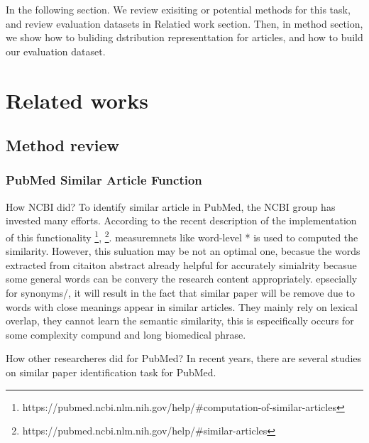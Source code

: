 \documentclass[11pt]{article}
\begin{document}
    In the following section. We review exisiting or potential methods for this task, and review evaluation datasets in Relatied work section. Then, in method section, we show how to buliding dstribution representtation for articles, and how to build our evaluation dataset.

    \section{Related works}

    \subsection{Method review}
    \subsubsection{PubMed Similar Article Function}
    How NCBI did?
    To identify similar article in PubMed, the NCBI group has invested many efforts. According to the recent description of the implementation of this functionality \footnote{https://pubmed.ncbi.nlm.nih.gov/help/#computation-of-similar-articles}, \footnote{https://pubmed.ncbi.nlm.nih.gov/help/#similar-articles}.
    measuremnets like word-level * is used to computed the similarity. However, this suluation may be not an optimal one, becasue the words extracted from citaiton abstract already helpful for accurately simialrity becasue some general words can be convery the research content appropriately.
    epsecially for synonyms/, it will result in the fact that similar paper will be remove due to words with close meanings appear in similar articles. They mainly rely on lexical overlap, they cannot learn the semantic similarity, this is especifically occurs for some complexity compund and long biomedical phrase.

    How other researcheres did for PubMed?
    In recent years, there are several studies on similar paper identification task for PubMed.
\end{document}
